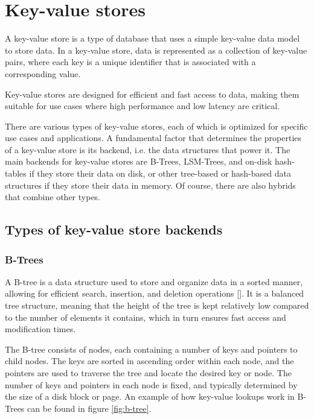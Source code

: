 \section{Key-value stores}

A key-value store is a type of database that uses a simple key-value data model to store data.
In a key-value store, data is represented as a collection of key-value pairs, where each key is a unique identifier that is associated with a corresponding value.

Key-value stores are designed for efficient and fast access to data, making them suitable for use cases where high performance and low latency are critical.

There are various types of key-value stores, each of which is optimized for specific use cases and applications. A fundamental factor that determines the properties of a key-value store is its backend, i.e. the data structures that power it. The main backends for key-value stores are B-Trees, LSM-Trees, and on-disk hash-tables if they store their data on disk, or other tree-based or hash-based data structures if they store their data in memory. Of course, there are also hybrids that combine other types.

\subsection{Types of key-value store backends}

\subsubsection{B-Trees}

A B-tree is a data structure used to store and organize data in a sorted manner, allowing for efficient search, insertion, and deletion operations [\cite{b-tree}]. It is a balanced tree structure, meaning that the height of the tree is kept relatively low compared to the number of elements it contains, which in turn ensures fast access and modification times.

The B-tree consists of nodes, each containing a number of keys and pointers to child nodes. The keys are sorted in ascending order within each node, and the pointers are used to traverse the tree and locate the desired key or node. The number of keys and pointers in each node is fixed, and typically determined by the size of a disk block or page. An example of how key-value lookups work in B-Trees can be found in figure \ref{fig:b-tree}.


